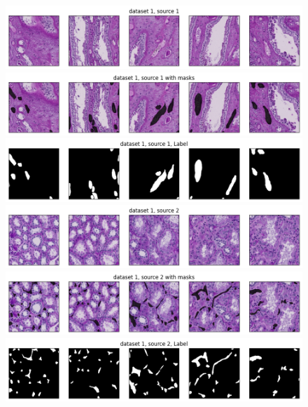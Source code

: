 \begin{figure}[H]
	\centering
	\includegraphics[width=\textwidth]{gambar/bab4/ds1s1_0.png}
	\includegraphics[width=\textwidth]{gambar/bab4/ds1s1_1.png}
	\includegraphics[width=\textwidth]{gambar/bab4/ds1s1_2.png}
	\includegraphics[width=\textwidth]{gambar/bab4/ds1s2_0.png}
	\includegraphics[width=\textwidth]{gambar/bab4/ds1s2_1.png}
	\includegraphics[width=\textwidth]{gambar/bab4/ds1s2_2.png}
	\label{fig:ds1_image}
	
\end{figure}


